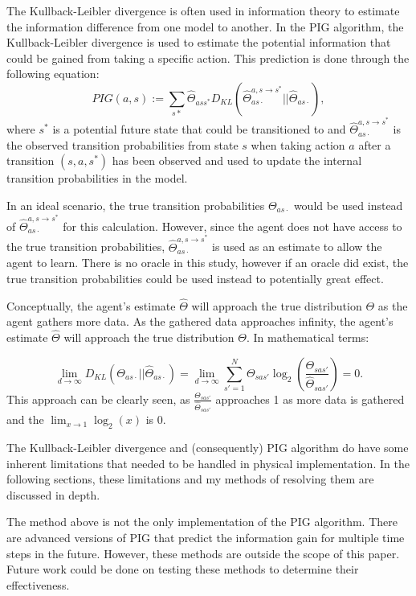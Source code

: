\documentclass[12pt]{thesis}
\begin{document}
The Kullback-Leibler divergence is often used in information theory to estimate the information difference from one model to another. In the PIG algorithm, the Kullback-Leibler divergence is used to estimate the potential information that could be gained from taking a specific action.
This prediction is done through the following equation:
\[ PIG(a,s) := \sum_{s*} \hat{\Theta}_{ass^{*}}D_{KL}(\hat{\Theta}_{as\cdot}^{a,s \rightarrow s^{*}} || \hat{\Theta}_{as\cdot}), \]
where $s^{*}$ is a potential future state that could be transitioned to and $\hat{\Theta}_{as\cdot}^{a,s \rightarrow s^{*}}$ is the observed transition probabilities from state $s$ when taking action $a$ after a transition $(s,a,s^{*})$ has been observed and used to update the internal transition probabilities in the model.

In an ideal scenario, the true transition probabilities $\Theta_{as\cdot}$ would be used instead of $\hat{\Theta}_{as\cdot}^{a,s \rightarrow s^{*}}$ for this calculation. However, since the agent does not have access to the true transition probabilities, $\hat{\Theta}_{as\cdot}^{a,s \rightarrow s^{*}}$ is used as an estimate to allow the agent to learn. There is no oracle in this study, however if an oracle did exist, the true transition probabilities could be used instead to potentially great effect.

Conceptually, the agent's estimate $\hat{\Theta}$ will approach the true distribution $\Theta$ as the agent gathers more data. As the gathered data approaches infinity, the agent's estimate $\hat{\Theta}$ will approach the true distribution $\Theta$. In mathematical terms:

\[ \lim_{d \rightarrow \infty} D_{KL}( \Theta_{as\cdot} || \hat{\Theta}_{as\cdot}) = \lim_{d \rightarrow \infty} \sum_{s' = 1}^{ N} \Theta_{sas'} \log_{2}\left(\frac{\Theta_{sas'}}{\hat{\Theta}_{sas'}}\right) = 0. \]
This approach can be clearly seen, as $\frac{\Theta_{sas'}}{\hat{\Theta}_{sas'}}$ approaches 1 as more data is gathered and the $\lim_{x \rightarrow 1} \log_{2}(x)$ is 0.

The Kullback-Leibler divergence and (consequently) PIG algorithm do have some inherent limitations that needed to be handled in physical implementation. In the following sections, these limitations and my methods of resolving them are discussed in depth.

The method above is not the only implementation of the PIG algorithm. There are advanced versions of PIG that predict the information gain for multiple time steps in the future. However, these methods are outside the scope of this paper. Future work could be done on testing these methods to determine their effectiveness.
\end{document}
